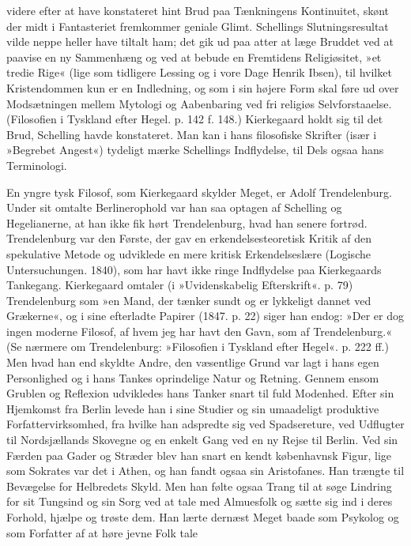 \documentclass[12pt,a4paper,openany]{book}
\newcommand{\opage}[1]{\marginnote{\footnotesize\textit{[#1]}}}
\begin{document}
videre efter at have konstateret hint Brud paa
Tænkningens Kontinuitet, skønt der midt i Fantasteriet
fremkommer geniale Glimt. Schellings Slutningsresultat
vilde neppe heller have tiltalt ham; det gik ud paa atter
at læge Bruddet ved at paavise en ny Sammenhæng og
ved at bebude en Fremtidens Religiøsitet, »et tredie
Rige« (lige som tidligere Lessing og i vore Dage Henrik
Ibsen), til hvilket Kristendommen kun er en Indledning,
og som i sin højere Form skal føre ud over Modsætningen
mellem Mytologi og Aabenbaring ved fri
religiøs Selvforstaaelse. (Filosofien i Tyskland efter
Hegel. p. 142 f. 148.) Kierkegaard holdt sig til det
Brud, Schelling havde konstateret. Man kan i hans
filosofiske Skrifter (især i »Begrebet Angest«) tydeligt
mærke Schellings Indflydelse, til Dels ogsaa hans Terminologi.

En yngre tysk Filosof, som Kierkegaard skylder
Meget, er Adolf Trendelenburg. Under sit omtalte Berlinerophold
var han saa optagen af Schelling og Hegelianerne,
at han ikke fik hørt Trendelenburg, hvad han
senere fortrød. Trendelenburg var den Første, der gav
en erkendelsesteoretisk Kritik af den spekulative Metode
og udviklede en mere kritisk Erkendelseslære (Logische
Untersuchungen. 1840), som har havt ikke ringe Indflydelse
paa Kierkegaards Tankegang. Kierkegaard omtaler
(i »Uvidenskabelig Efterskrift«. p. 79) Trendelenburg
som »en Mand, der tænker sundt og er lykkeligt
dannet ved Grækerne«, og i sine efterladte Papirer (1847.
p. 22) siger han endog: »Der er dog ingen moderne
Filosof, af hvem jeg har havt den Gavn, som af Trendelenburg.«
(Se nærmere om Trendelenburg: »Filosofien
i Tyskland efter Hegel«. p. 222 ff.)
\opage{57}Men hvad han end skyldte Andre, den væsentlige
Grund var lagt i hans egen Personlighed og i hans
Tankes oprindelige Natur og Retning. Gennem ensom
Grublen og Reflexion udvikledes hans Tanker snart til
fuld Modenhed. Efter sin Hjemkomst fra Berlin levede
han i sine Studier og sin umaadeligt produktive Forfattervirksomhed,
fra hvilke han adspredte sig ved Spadsereture,
ved Udflugter til Nordsjællands Skovegne og
en enkelt Gang ved en ny Rejse til Berlin. Ved sin Færden
paa Gader og Stræder blev han snart en kendt københavnsk
Figur, lige som Sokrates var det i Athen, og han
fandt ogsaa sin Aristofanes. Han trængte til Bevægelse
for Helbredets Skyld. Men han følte ogsaa Trang til at
søge Lindring for sit Tungsind og sin Sorg ved at tale
med Almuesfolk og sætte sig ind i deres Forhold, hjælpe
og trøste dem. Han lærte dernæst Meget baade som
Psykolog og som Forfatter af at høre jevne Folk tale
\end{document}
